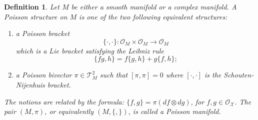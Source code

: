 \documentclass{amsart}
\newtheorem{definition}[theorem]{Definition}
\newcommand{\cO}{\mathcal{O}}
\newcommand{\cX}{\mathcal{X}}
\newcommand{\cT}{\mathcal{T}}
\begin{document}
\begin{definition}
Let $M$ be either a smooth manifold or a complex manifold. A Poisson structure on $M$ is one of the two following equivalent structures:
  \begin{enumerate}
    \item a Poisson bracket
      $$
				\{\cdot, \cdot\}: \cO_M \times \cO_M \to \cO_M
			$$
			which is a Lie bracket satisfying the Leibniz rule
			$$
				\{fg, h\} = f\{g,h\} + g\{f,h\};
			$$
		\item a Poisson bivector $\pi \in \cT^2_M$ such that $[\pi, \pi] = 0$ where $[\cdot, \cdot]$ is the Schouten-Nijenhuis bracket.
\end{enumerate}	
The notions are related by the formula: $\{f, g\} = \pi (df \otimes dg)$, for $f, g\in \cO_\cX$. The pair $(M, \pi)$, or equivalently $(M, \{,\})$, is called a Poisson manifold.
\end{definition}


\end{document}
